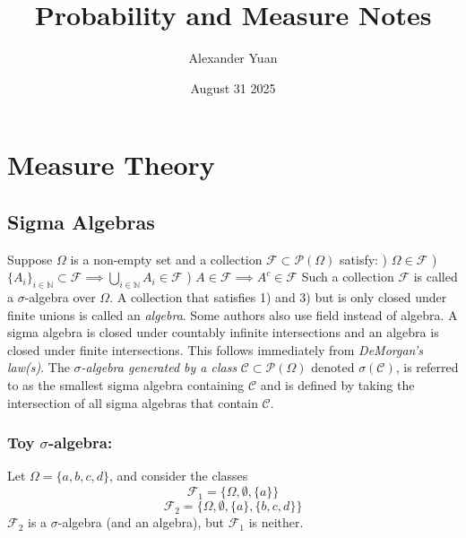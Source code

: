 \documentclass{article}
\title{Probability and Measure Notes}
\author{Alexander Yuan}
\date{August 31 2025}
\begin{document}
\maketitle
\section{Measure Theory}

\subsection{Sigma Algebras}
Suppose $\Omega$ is a non-empty set and a collection $\mathcal{F} \subset \mathcal{P}(\Omega)$ satisfy: \newline {}) $\Omega \in \mathcal{F}$ \newline {}) $\{A_i\}_{i \in \mathbb{N}} \subset \mathcal{F} \implies \bigcup_{i \in\mathbb{N}}A_i \in \mathcal{F}$ \newline {}) $A \in \mathcal{F} \implies A^c\in \mathcal{F} $ \newline \newline
Such a collection  $\mathcal{F}$ is called a $\sigma$-algebra over $\Omega$. A collection that satisfies 1) and 3) but is only closed under finite unions is called an \emph{algebra}. Some authors also use field instead of algebra. \newline \newline
A sigma algebra is closed under countably infinite intersections and an algebra is closed under finite intersections. This follows immediately from \emph{DeMorgan's law(s)}.\newline \newline
The \emph{$\sigma$-algebra generated by a class} $\mathcal{C}\subset \mathcal{P}(\Omega)$ denoted $\sigma(\mathcal{C})$, is referred to as the smallest sigma algebra containing $\mathcal{C}$ and is defined by taking the intersection of all sigma algebras that contain $\mathcal{C}$.

\subsubsection{Toy $\sigma$-algebra:}
Let $\Omega = \{a,b,c,d\}$, and consider the classes \[
\mathcal{F}_1 = \{\Omega, \emptyset, \{a\}\}
\]
\[
\mathcal{F}_2 = \{\Omega, \emptyset, \{a\}, \{b,c,d\}\}
\]
$\mathcal{F}_2$ is a $\sigma$-algebra (and an algebra), but $\mathcal{F}_1$ is neither. 
\end{document}
